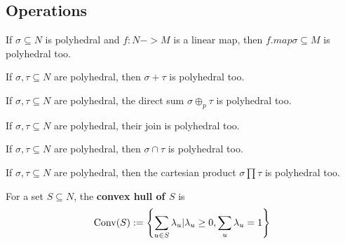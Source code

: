 \subsection{Operations}

\begin{proposition}
  \label{linear-transformation-polyhedral-cone}
  If \( \sigma \subseteq N \) is
  polyhedral and \(f : N -> M\) is a linear map, then \( f.map \sigma \subseteq M \) is polyhedral too.
\end{proposition}

\begin{proposition}
  \label{sum-polyhedral-cone}
  If \( \sigma, \tau \subseteq N \) are
  polyhedral, then \( \sigma + \tau \) is polyhedral too.
\end{proposition}

\begin{proposition}
  \label{direct-sum-polyhedral-cone}
  If \( \sigma, \tau \subseteq N \) are
  polyhedral, the direct sum \( \sigma \oplus_p \tau \) is polyhedral too.
\end{proposition}

\begin{proposition}
  \label{join-polyhedral-cone}
  If \( \sigma, \tau \subseteq N \) are
  polyhedral, their join is polyhedral too.
\end{proposition}

\begin{proposition}
  \label{intersection-polyhedral-cone}
  If \( \sigma, \tau \subseteq N \) are
  polyhedral, then \( \sigma \cap \tau \) is polyhedral too.
\end{proposition}

\begin{proposition}
  \label{product-polyhedral-cone}
  If \( \sigma, \tau \subseteq N \) are
  polyhedral, then the cartesian product \( \sigma \prod \tau \) is polyhedral too.
\end{proposition}


\begin{definition}
  \label{convex-hull}
  \uses{}
  For a set $S \subseteq N$, the {\bf convex hull of $S$} is
  $$\operatorname{Conv}(S) := \left\{\sum_{u \in S} \lambda_u | \lambda_u \ge 0, \sum_u \lambda_u = 1\right\}$$
\end{definition}

